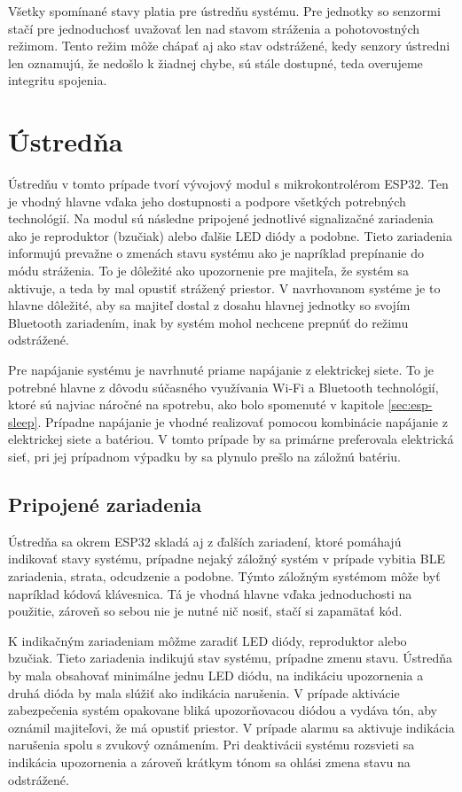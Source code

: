 Všetky spomínané stavy platia pre ústredňu systému. Pre jednotky so senzormi stačí pre jednoduchosť uvažovať len nad stavom stráženia a pohotovostných režimom. Tento režim môže chápať aj ako stav odstrážené, kedy senzory ústredni len oznamujú, že nedošlo k žiadnej chybe, sú stále dostupné, teda overujeme integritu spojenia.

\section{Ústredňa}

Ústredňu v tomto prípade tvorí vývojový modul s mikrokontrolérom ESP32. Ten je vhodný hlavne vďaka jeho dostupnosti a podpore všetkých potrebných technológií. Na modul sú následne pripojené jednotlivé signalizačné zariadenia ako je reproduktor (bzučiak) alebo ďalšie LED diódy a podobne. Tieto zariadenia informujú prevažne o zmenách stavu systému ako je napríklad prepínanie do módu stráženia. To je dôležité ako upozornenie pre majiteľa, že systém sa aktivuje, a teda by mal opustiť strážený priestor. V navrhovanom systéme je to hlavne dôležité, aby sa majiteľ dostal z dosahu hlavnej jednotky so svojím Bluetooth zariadením, inak by systém mohol nechcene prepnúť do režimu odstrážené.

Pre napájanie systému je navrhnuté priame napájanie z elektrickej siete. To je potrebné hlavne z dôvodu súčasného využívania Wi-Fi a Bluetooth technológií, ktoré sú najviac náročné na spotrebu, ako bolo spomenuté v kapitole \ref{sec:esp-sleep}. Prípadne napájanie je vhodné realizovať pomocou kombinácie napájanie z elektrickej siete a batériou. V tomto prípade by sa primárne preferovala elektrická sieť, pri jej prípadnom výpadku by sa plynulo prešlo na záložnú batériu.

\subsection{Pripojené zariadenia}

Ústredňa sa okrem ESP32 skladá aj z ďalších zariadení, ktoré pomáhajú indikovať stavy systému, prípadne nejaký záložný systém v prípade vybitia BLE zariadenia, strata, odcudzenie a podobne. Týmto záložným systémom môže byť napríklad kódová klávesnica. Tá je vhodná hlavne vďaka jednoduchosti na použitie, zároveň so sebou nie je nutné nič nosiť, stačí si zapamätať kód.

K indikačným zariadeniam môžme zaradiť LED diódy, reproduktor alebo bzučiak. Tieto zariadenia indikujú stav systému, prípadne zmenu stavu. Ústredňa by mala obsahovať minimálne jednu LED diódu, na indikáciu upozornenia a druhá dióda by mala slúžiť ako indikácia narušenia. V prípade aktivácie zabezpečenia systém opakovane bliká upozorňovacou diódou a vydáva tón, aby oznámil majiteľovi, že má opustiť priestor. V prípade alarmu sa aktivuje indikácia narušenia spolu s zvukový oznámením. Pri deaktivácii systému rozsvieti sa indikácia upozornenia a zároveň krátkym tónom sa ohlási zmena stavu na odstrážené.

